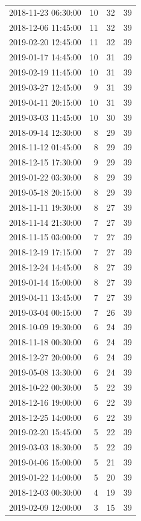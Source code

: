 \begin{tabular}{lrrr}
2018-11-23 06:30:00 & 10 & 32 & 39 \\
2018-12-06 11:45:00 & 11 & 32 & 39 \\
2019-02-20 12:45:00 & 11 & 32 & 39 \\
2019-01-17 14:45:00 & 10 & 31 & 39 \\
2019-02-19 11:45:00 & 10 & 31 & 39 \\
2019-03-27 12:45:00 & 9 & 31 & 39 \\
2019-04-11 20:15:00 & 10 & 31 & 39 \\
2019-03-03 11:45:00 & 10 & 30 & 39 \\
2018-09-14 12:30:00 & 8 & 29 & 39 \\
2018-11-12 01:45:00 & 8 & 29 & 39 \\
2018-12-15 17:30:00 & 9 & 29 & 39 \\
2019-01-22 03:30:00 & 8 & 29 & 39 \\
2019-05-18 20:15:00 & 8 & 29 & 39 \\
2018-11-11 19:30:00 & 8 & 27 & 39 \\
2018-11-14 21:30:00 & 7 & 27 & 39 \\
2018-11-15 03:00:00 & 7 & 27 & 39 \\
2018-12-19 17:15:00 & 7 & 27 & 39 \\
2018-12-24 14:45:00 & 8 & 27 & 39 \\
2019-01-14 15:00:00 & 8 & 27 & 39 \\
2019-04-11 13:45:00 & 7 & 27 & 39 \\
2019-03-04 00:15:00 & 7 & 26 & 39 \\
2018-10-09 19:30:00 & 6 & 24 & 39 \\
2018-11-18 00:30:00 & 6 & 24 & 39 \\
2018-12-27 20:00:00 & 6 & 24 & 39 \\
2019-05-08 13:30:00 & 6 & 24 & 39 \\
2018-10-22 00:30:00 & 5 & 22 & 39 \\
2018-12-16 19:00:00 & 6 & 22 & 39 \\
2018-12-25 14:00:00 & 6 & 22 & 39 \\
2019-02-20 15:45:00 & 5 & 22 & 39 \\
2019-03-03 18:30:00 & 5 & 22 & 39 \\
2019-04-06 15:00:00 & 5 & 21 & 39 \\
2019-01-22 14:00:00 & 5 & 20 & 39 \\
2018-12-03 00:30:00 & 4 & 19 & 39 \\
2019-02-09 12:00:00 & 3 & 15 & 39 \\

\end{tabular}
